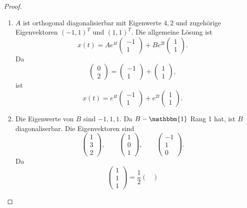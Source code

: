\begin{proof}
	\begin{parts}
	\item 
		\begin{enumerate}[label=\roman*)]
			\item $A$ ist orthogonal diagonalisierbar mit Eigenwerte $4,2$ und zugehörige Eigenvektoren $(-1,1)^T$ und $(1,1)^T$. Die allgemeine L\"{o}sung ist
			\[x(t) = Ae^{4t}\begin{pmatrix}
				-1\\ 1
			\end{pmatrix}+Be^{2t}\begin{pmatrix}
			1 \\ 1
		\end{pmatrix}.\]
	Da
	\[\begin{pmatrix}
		0 \\2
	\end{pmatrix}=\begin{pmatrix}
	-1 \\ 1
\end{pmatrix}+\begin{pmatrix}
1 \\ 1
\end{pmatrix},\]
ist
\[x(t) = e^{4t}\begin{pmatrix}
	-1 \\ 1
\end{pmatrix}+e^{2t}\begin{pmatrix}
1 \\ 1
\end{pmatrix}.\]
\item Die Eigenwerte von $B$ sind $-1,1,1$. Da $B-\mathbbm{1}$ Rang 1 hat, ist $B$ diagonaliserbar. Die Eigenvektoren sind
\[\begin{pmatrix}
	1 \\ 3 \\ 2
\end{pmatrix},\qquad \begin{pmatrix}
1 \\ 0 \\ 1
\end{pmatrix},\qquad \begin{pmatrix}
-1 \\ 1 \\ 0
\end{pmatrix}.\]
Da
\[\begin{pmatrix}
	1 \\ 1 \\ 1
\end{pmatrix}=\frac 12 \begin{pmatrix}

\end{pmatrix}\]
\end{enumerate}
\end{parts}
\end{proof}
